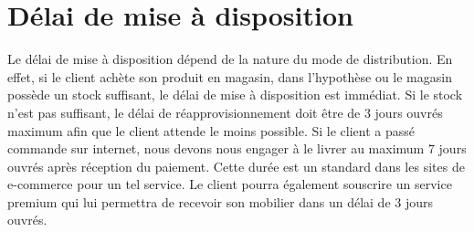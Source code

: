 \section{Délai de mise à disposition}
Le délai de mise à disposition dépend de la nature du mode de distribution.
En effet, si le client achète son produit en magasin, dans l'hypothèse ou le magasin possède un stock suffisant, le délai de mise à disposition est immédiat. Si le stock n'est pas suffisant, le délai de réapprovisionnement doit être de 3 jours ouvrés maximum afin que le client attende le moins possible.
Si le client a passé commande sur internet, nous devons nous engager à le livrer au maximum 7 jours ouvrés après réception du paiement. Cette durée est un standard dans les sites de e-commerce pour un tel service. Le client pourra également souscrire un service premium qui lui permettra de recevoir son mobilier dans un délai de 3 jours ouvrés. 
